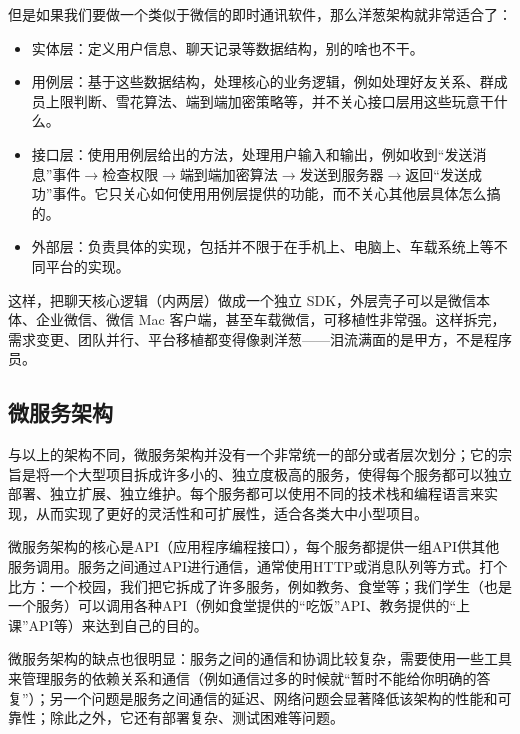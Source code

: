 \documentclass[../main.tex]{subfiles}
\begin{document}
但是如果我们要做一个类似于微信的即时通讯软件，那么洋葱架构就非常适合了：
\begin{itemize}
  \item 实体层：定义用户信息、聊天记录等数据结构，别的啥也不干。
  \item 用例层：基于这些数据结构，处理核心的业务逻辑，例如处理好友关系、群成员上限判断、雪花算法、端到端加密策略等，并不关心接口层用这些玩意干什么。
  \item 接口层：使用用例层给出的方法，处理用户输入和输出，例如收到“发送消息”事件$\rightarrow$检查权限$\rightarrow$端到端加密算法$\rightarrow$发送到服务器$\rightarrow$返回“发送成功”事件。它只关心如何使用用例层提供的功能，而不关心其他层具体怎么搞的。
  \item 外部层：负责具体的实现，包括并不限于在手机上、电脑上、车载系统上等不同平台的实现。
\end{itemize}

这样，把聊天核心逻辑（内两层）做成一个独立 SDK，外层壳子可以是微信本体、企业微信、微信 Mac 客户端，甚至车载微信，可移植性非常强。这样拆完，需求变更、团队并行、平台移植都变得像剥洋葱——泪流满面的是甲方，不是程序员。

\subsection{微服务架构}

与以上的架构不同，微服务架构并没有一个非常统一的部分或者层次划分；它的宗旨是将一个大型项目拆成许多小的、独立度极高的服务，使得每个服务都可以独立部署、独立扩展、独立维护。每个服务都可以使用不同的技术栈和编程语言来实现，从而实现了更好的灵活性和可扩展性，适合各类大中小型项目。

微服务架构的核心是API（应用程序编程接口），每个服务都提供一组API供其他服务调用。服务之间通过API进行通信，通常使用HTTP或消息队列等方式。打个比方：一个校园，我们把它拆成了许多服务，例如教务、食堂等；我们学生（也是一个服务）可以调用各种API（例如食堂提供的“吃饭”API、教务提供的“上课”API等）来达到自己的目的。

微服务架构的缺点也很明显：服务之间的通信和协调比较复杂，需要使用一些工具来管理服务的依赖关系和通信（例如通信过多的时候就“暂时不能给你明确的答复”）；另一个问题是服务之间通信的延迟、网络问题会显著降低该架构的性能和可靠性；除此之外，它还有部署复杂、测试困难等问题。
\end{document}

